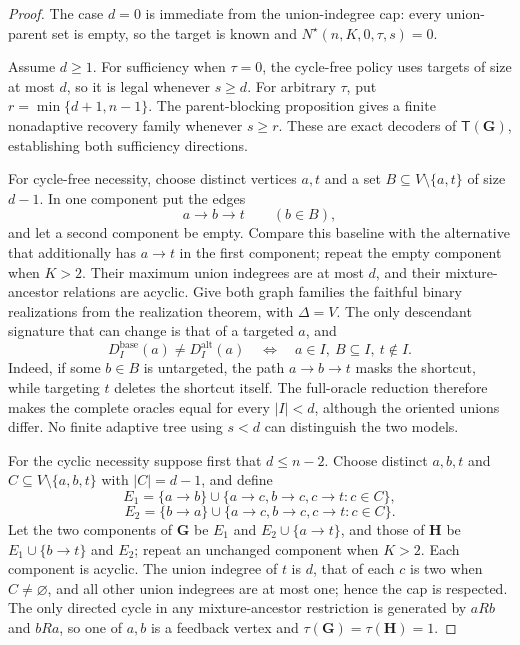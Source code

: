\documentclass{article}
\begin{document}
\begin{proof}
The case \(d=0\) is immediate from the union-indegree cap: every union-parent set is empty, so the target is known and \(N^{\star}(n,K,0,\tau,s)=0\).

Assume \(d\ge1\). For sufficiency when \(\tau=0\), the cycle-free policy uses targets of size at most \(d\), so it is legal whenever \(s\ge d\). For arbitrary \(\tau\), put \(r=\min\{d+1,n-1\}\). The parent-blocking proposition gives a finite nonadaptive recovery family whenever \(s\ge r\). These are exact decoders of \(\mathsf T(\mathbf G)\), establishing both sufficiency directions.

For cycle-free necessity, choose distinct vertices \(a,t\) and a set \(B\subseteq V\setminus\{a,t\}\) of size \(d-1\). In one component put the edges
\[
 a\to b\to t\qquad(b\in B),
\]
and let a second component be empty. Compare this baseline with the alternative that additionally has \(a\to t\) in the first component; repeat the empty component when \(K>2\). Their maximum union indegrees are at most \(d\), and their mixture-ancestor relations are acyclic. Give both graph families the faithful binary realizations from the realization theorem, with \(\Delta=V\). The only descendant signature that can change is that of a targeted \(a\), and
\[
 D_I^{\mathrm{base}}(a)\ne D_I^{\mathrm{alt}}(a)
 \quad\Longleftrightarrow\quad
 a\in I,\ B\subseteq I,\ t\notin I.
\]
Indeed, if some \(b\in B\) is untargeted, the path \(a\to b\to t\) masks the shortcut, while targeting \(t\) deletes the shortcut itself. The full-oracle reduction therefore makes the complete oracles equal for every \(|I|<d\), although the oriented unions differ. No finite adaptive tree using \(s<d\) can distinguish the two models.

For the cyclic necessity suppose first that \(d\le n-2\). Choose distinct \(a,b,t\) and \(C\subseteq V\setminus\{a,b,t\}\) with \(|C|=d-1\), and define
\[
 E_1=\{a\to b\}\cup\{a\to c,b\to c,c\to t:c\in C\},
\]
\[
 E_2=\{b\to a\}\cup\{a\to c,b\to c,c\to t:c\in C\}.
\]
Let the two components of \(\mathbf G\) be \(E_1\) and \(E_2\cup\{a\to t\}\), and those of \(\mathbf H\) be \(E_1\cup\{b\to t\}\) and \(E_2\); repeat an unchanged component when \(K>2\). Each component is acyclic. The union indegree of \(t\) is \(d\), that of each \(c\) is two when \(C\ne\varnothing\), and all other union indegrees are at most one; hence the cap is respected. The only directed cycle in any mixture-ancestor restriction is generated by \(aR b\) and \(bR a\), so one of \(a,b\) is a feedback vertex and \(\tau(\mathbf G)=\tau(\mathbf H)=1\).


\end{proof}
\end{document}
